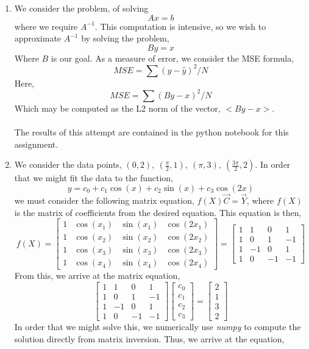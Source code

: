 \documentclass[letterpaper,10pt]{article}
\begin{document}
\begin{enumerate}
\item We consider the problem, of solving
\[Ax=b\]
where we require $A^{-1}$. This computation is intensive, so we wish to approximate $A^{-1}$ by solving the problem,
\[By=x\]
Where $B$ is our goal. As a measure of error, we consider the MSE formula,
\[MSE=\sum(y-\hat{y})^2/N\]
Here,
\[MSE=\sum(By-x)^2/N\]
Which may be computed as the L2 norm of the vector, $<By-x>$.\\\\
The results of this attempt are contained in the python notebook for this assignment.
\item We consider the data points, $(0,2),\ (\frac{\pi}{2},1),\ (\pi,3),\ (\frac{3\pi}{2},2)$. In order that we might fit the data to the function,
\[y=c_0+c_1\cos(x)+c_2\sin(x)+c_3\cos(2x)\]
we must consider the following matrix equation, $f(X)\vec{C}=\vec{Y}$, where $f(X)$ is the matrix of coefficients from the desired equation. This equation is then,
\[f(X)=\begin{bmatrix}
1 & \cos(x_1) & \sin(x_1) & \cos(2x_1) \\
1 & \cos(x_2) & \sin(x_2) & \cos(2x_2) \\
1 & \cos(x_3) & \sin(x_3) & \cos(2x_3) \\
1 & \cos(x_4) & \sin(x_4) & \cos(2x_4)
\end{bmatrix}=\begin{bmatrix}
1 & 1 & 0 & 1 \\
1 & 0 & 1 & -1 \\
1 & -1 & 0 & 1 \\
1 & 0 & -1 & -1
\end{bmatrix}\]
From this, we arrive at the matrix equation,
\[\begin{bmatrix}
1 & 1 & 0 & 1 \\
1 & 0 & 1 & -1 \\
1 & -1 & 0 & 1 \\
1 & 0 & -1 & -1
\end{bmatrix}\begin{bmatrix}
c_0\\
c_1\\
c_2\\
c_3
\end{bmatrix}=\begin{bmatrix}
2\\
1\\
3\\
2
\end{bmatrix}\]
In order that we might solve this, we numerically use \textit{numpy} to compute the solution directly from matrix inversion. Thus, we arrive at the equation,

\end{enumerate}
\end{document}
